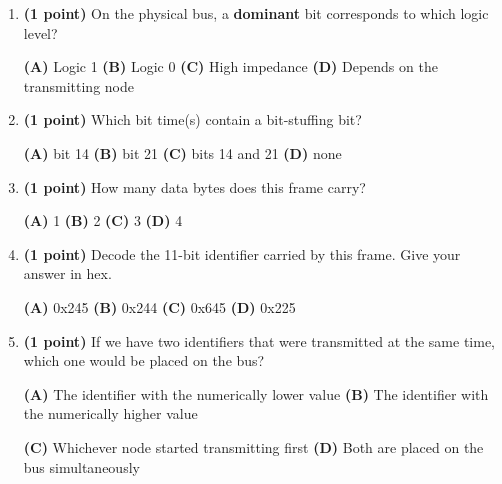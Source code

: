 \documentclass[10pt]{article}
\begin{document}
\begin{enumerate}[label=\textbf{\arabic*.}, leftmargin=*, itemsep=4pt]
\begin{enumerate}[label=(\alph*), leftmargin=*, itemsep=3pt]
\item \textbf{(1 point)} On the physical bus, a \textbf{dominant} bit corresponds to which logic level?

\centerline{\textbf{(A)} Logic 1 \qquad \textbf{(B)} Logic 0 \qquad \textbf{(C)} High impedance \qquad \textbf{(D)} Depends on the transmitting node}

\item \textbf{(1 point)} Which bit time(s) contain a bit-stuffing bit?

\centerline{\textbf{(A)} bit 14 \qquad \textbf{(B)} bit 21 \qquad \textbf{(C)} bits 14 and 21 \qquad \textbf{(D)} none}

\item \textbf{(1 point)} How many data bytes does this frame carry?

\centerline{\textbf{(A)} 1 \qquad \textbf{(B)} 2 \qquad \textbf{(C)} 3 \qquad \textbf{(D)} 4}

\item \textbf{(1 point)} Decode the 11-bit identifier carried by this frame. Give your answer in hex.

\centerline{\textbf{(A)} 0x245 \qquad \textbf{(B)} 0x244 \qquad \textbf{(C)} 0x645 \qquad \textbf{(D)} 0x225}

\item \textbf{(1 point)} If we have two identifiers that were transmitted at the same time, which one would be placed on the bus?

\centerline{\textbf{(A)} The identifier with the numerically lower value \qquad \textbf{(B)} The identifier with the numerically higher value}

\centerline{\textbf{(C)} Whichever node started transmitting first \qquad \textbf{(D)} Both are placed on the bus simultaneously}
\end{enumerate}

\end{enumerate}
\end{document}
